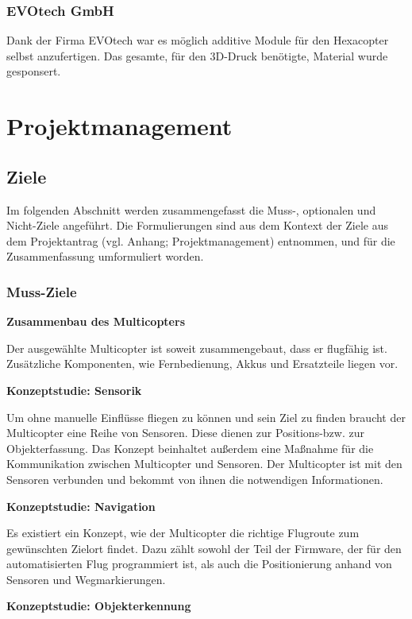 \subsection*{EVOtech GmbH}
Dank der Firma {EVOtech\cite{evotech}} war es möglich additive Module für den Hexacopter selbst anzufertigen.
Das gesamte, für den 3D-Druck benötigte, Material wurde gesponsert.

\chapter{Projektmanagement}
\renewcommand{\kapitelautor}{Autor: Markus Kaiser}

\section{Ziele}
Im folgenden Abschnitt werden zusammengefasst die Muss-, optionalen und Nicht-Ziele angeführt.
Die Formulierungen sind aus dem Kontext der Ziele aus dem Projektantrag (vgl. Anhang; Projektmanagement) entnommen, und für die
Zusammenfassung umformuliert worden.

  \subsection{Muss-Ziele}
  \textbf{Zusammenbau des Multicopters}

  Der ausgewählte Multicopter ist soweit zusammengebaut, dass er flugfähig ist.
  Zusätzliche Komponenten, wie Fernbedienung, Akkus und Ersatzteile liegen vor.

  \textbf{Konzeptstudie: Sensorik}

  Um ohne manuelle Einflüsse fliegen zu können und sein Ziel zu finden braucht der Multicopter eine Reihe
  von Sensoren. Diese dienen zur Positions-bzw. zur Objekterfassung. Das Konzept beinhaltet außerdem eine
  Maßnahme für die Kommunikation zwischen Multicopter und Sensoren.
  Der Multicopter ist mit den Sensoren verbunden und bekommt von ihnen die notwendigen Informationen.

  \textbf{Konzeptstudie: Navigation}

  Es existiert ein Konzept, wie der Multicopter die richtige Flugroute zum gewünschten
  Zielort findet. Dazu zählt sowohl der Teil der Firmware, der für den automatisierten Flug programmiert ist,
  als auch die Positionierung anhand von Sensoren und Wegmarkierungen.

  \textbf{Konzeptstudie: Objekterkennung}

